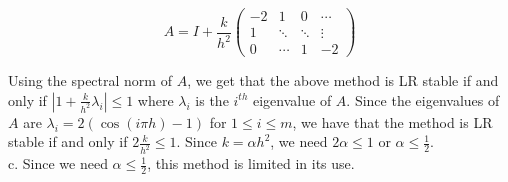 \begin{solution}
    $$A=I+\frac{k}{h^2}\left(\begin{array}{cccc} -2 & 1 & 0 & \cdots \\ 1 & \ddots & \ddots & \vdots 
                                              \\ 0 & \cdots & 1 & -2 \end{array}\right)$$
                                              
    Using the spectral norm of $A$, we get that the above method is LR stable if and only if 
    $|1+\frac{k}{h^2}\lambda_i|\leq1$ where $\lambda_i$ is the $i^{th}$ eigenvalue of $A$. Since the
    eigenvalues of $A$ are $\lambda_i=2(\cos(i\pi h)-1)$ for $1\leq i\leq m$, we have that the method
    is LR stable if and only if $2\frac{k}{h^2}\leq1$. Since $k=\alpha h^2$, we need $2\alpha\leq1$ or
    $\alpha\leq\frac12$.\\

    c. Since we need $\alpha\leq\frac12$, this method is limited in its use.

\end{solution}